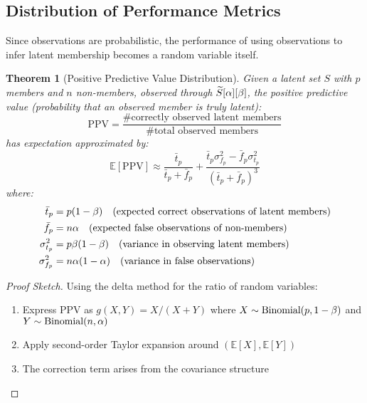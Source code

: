 \documentclass[11pt,final,hidelinks]{article}
\newtheorem{theorem}{Theorem}[section]
\begin{document}
\subsection{Distribution of Performance Metrics}

Since observations are probabilistic, the performance of using observations to infer latent membership becomes a random variable itself.

\begin{theorem}[Positive Predictive Value Distribution]
Given a latent set $S$ with $p$ members and $n$ non-members, observed through $\widetilde{S}[\alpha][\beta]$, the positive predictive value (probability that an observed member is truly latent):
\begin{equation}
\text{PPV} = \frac{\text{\# correctly observed latent members}}{\text{\# total observed members}}
\end{equation}
has expectation approximated by:
\begin{equation}
\mathbb{E}[\text{PPV}] \approx \frac{\bar{t}_p}{\bar{t}_p + \bar{f}_p} + \frac{\bar{t}_p \sigma_{f_p}^2 - \bar{f}_p \sigma_{t_p}^2}{(\bar{t}_p + \bar{f}_p)^3}
\end{equation}
where:
\begin{align}
\bar{t}_p &= p(1-\beta) \quad \text{(expected correct observations of latent members)} \\
\bar{f}_p &= n\alpha \quad \text{(expected false observations of non-members)} \\
\sigma_{t_p}^2 &= p\beta(1-\beta) \quad \text{(variance in observing latent members)} \\
\sigma_{f_p}^2 &= n\alpha(1-\alpha) \quad \text{(variance in false observations)}
\end{align}
\end{theorem}

\begin{proof}[Proof Sketch]
Using the delta method for the ratio of random variables:
\begin{enumerate}
    \item Express PPV as $g(X,Y) = X/(X+Y)$ where $X \sim \text{Binomial}(p, 1-\beta)$ and $Y \sim \text{Binomial}(n, \alpha)$
    \item Apply second-order Taylor expansion around $(\mathbb{E}[X], \mathbb{E}[Y])$
    \item The correction term arises from the covariance structure
\end{enumerate}
\end{proof}
\end{document}
